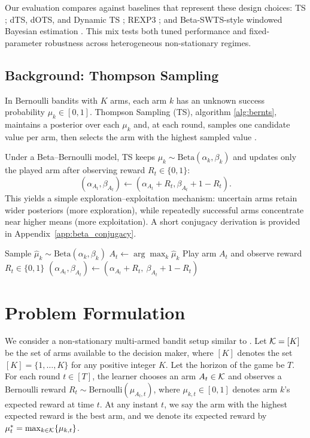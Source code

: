 \documentclass{article}
\begin{document}
Our evaluation compares against baselines that represent these design choices: TS \cite{thompson1933,russo2018tutorial}; dTS, dOTS, and Dynamic TS \cite{raj2017taming}; REXP3 \cite{besbes2014,auer2002nonstochastic}; and Beta-SWTS-style windowed Bayesian estimation \cite{trovo2020}. This mix tests both tuned performance and fixed-parameter robustness across heterogeneous non-stationary regimes.

\subsection{Background: Thompson Sampling}
In Bernoulli bandits with $K$ arms, each arm $k$ has an unknown success probability $\mu_k \in [0,1]$. Thompson Sampling (TS), algorithm \ref{alg:bernts}, maintains a posterior over each $\mu_k$ and, at each round, samples one candidate value per arm, then selects the arm with the highest sampled value \cite{thompson1933,russo2018tutorial}.

Under a Beta--Bernoulli model, TS keeps $\mu_k \sim \mathrm{Beta}(\alpha_k,\beta_k)$ and updates only the played arm after observing reward $R_t \in \{0,1\}$:
\[
(\alpha_{A_t},\beta_{A_t}) \leftarrow (\alpha_{A_t}+R_t,\beta_{A_t}+1-R_t).
\]
This yields a simple exploration--exploitation mechanism: uncertain arms retain wider posteriors (more exploration), while repeatedly successful arms concentrate near higher means (more exploitation). A short conjugacy derivation is provided in Appendix~\ref{app:beta_conjugacy}.

\begin{algorithm}[!htbp]
\caption{\textsc{BernTS}$(K,\alpha,\beta)$ (Beta--Bernoulli Thompson Sampling)}
\label{alg:bernts}
\begin{algorithmic}[1]
        \STATE Sample $\hat{\mu}_{k} \sim \mathrm{Beta}(\alpha_k,\beta_k)$
    \ENDFOR
    \STATE $A_t \leftarrow \arg\max_{k} \hat{\mu}_{k}$
    \STATE Play arm $A_t$ and observe reward $R_t \in \{0,1\}$
    \STATE $(\alpha_{A_t},\beta_{A_t}) \leftarrow (\alpha_{A_t} + R_t,\ \beta_{A_t} + 1 - R_t)$
\ENDFOR
\end{algorithmic}
\end{algorithm}


\section{Problem Formulation}
We consider a non-stationary multi-armed bandit setup similar to \cite{raj2017taming}.
Let $\mathcal{K}=[K]$ be the set of arms available to the decision maker, where $[K]$ denotes the set $[K]=\{1,\ldots,K\}$ for any positive integer $K$.
Let the horizon of the game be $T$. For each round $t\in[T]$, the learner chooses an arm $A_t\in\mathcal{K}$ and observes a Bernoulli reward
$R_t\sim\mathrm{Bernoulli}(\mu_{A_t,t})$, where $\mu_{k,t}\in[0,1]$ denotes arm $k$'s expected reward at time $t$.
At any instant $t$, we say the arm with the highest expected reward is the best arm, and we denote its expected reward by $\mu^*_t = \max_{k \in \mathcal{K}}\{\mu_{k,t}\}$.
\end{document}
